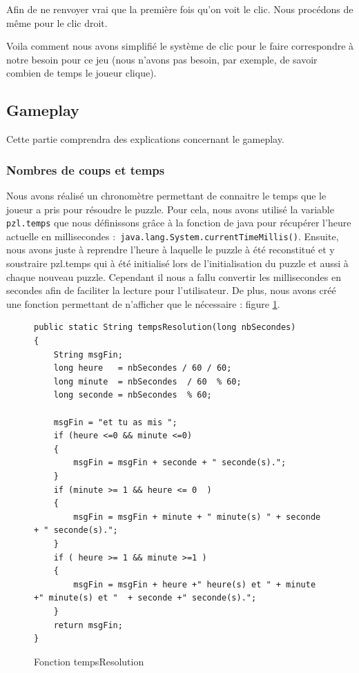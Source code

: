 \documentclass[]{article}
\newcommand{\variable}[1]{\noindent \texttt{#1}}
\begin{document}
Afin de ne renvoyer vrai que la première fois qu'on voit le clic. Nous procédons de même pour le clic droit.

Voila comment nous avons simplifié le système de clic pour le faire correspondre à notre besoin pour ce jeu (nous n'avons pas besoin, par exemple, de savoir combien de temps le joueur clique).


\newpage
\subsection{Gameplay}

Cette partie comprendra des explications concernant le gameplay. 

\subsubsection{Nombres de coups et temps}

Nous avons réalisé un chronomètre permettant de connaitre le temps que le joueur a pris pour résoudre le puzzle. 
Pour cela, nous avons utilisé la variable \variable{pzl.temps} que nous définissons grâce à la fonction de java pour récupérer l'heure actuelle en millisecondes :\variable{ java.lang.System.currentTimeMillis()}. 
Ensuite, nous avons juste à reprendre l'heure à laquelle le puzzle à été reconstitué et y soustraire pzl.temps qui à été initialisé lors de l'initialisation du puzzle et aussi à chaque nouveau puzzle.
Cependant il nous a fallu convertir les millisecondes en secondes afin de faciliter la lecture pour l'utilisateur. De plus, nous avons créé une fonction permettant de n'afficher que le nécessaire : figure \no\ref{Fonction tempsResolution}.

\begin{figure}[hpt]
	\center
	\caption{\label{Fonction tempsResolution} Fonction tempsResolution}
\begin{lstlisting}
public static String tempsResolution(long nbSecondes)
{
    String msgFin;
    long heure   = nbSecondes / 60 / 60;
    long minute  = nbSecondes  / 60  % 60;
    long seconde = nbSecondes  % 60;

    msgFin = "et tu as mis ";
    if (heure <=0 && minute <=0)
    {
        msgFin = msgFin + seconde + " seconde(s).";
    }
    if (minute >= 1 && heure <= 0  )
    {
        msgFin = msgFin + minute + " minute(s) " + seconde + " seconde(s).";
    }
    if ( heure >= 1 && minute >=1 )
    {
        msgFin = msgFin + heure +" heure(s) et " + minute +" minute(s) et "  + seconde +" seconde(s).";
    }
    return msgFin;
}
\end{lstlisting}
\end{figure}
\end{document}

